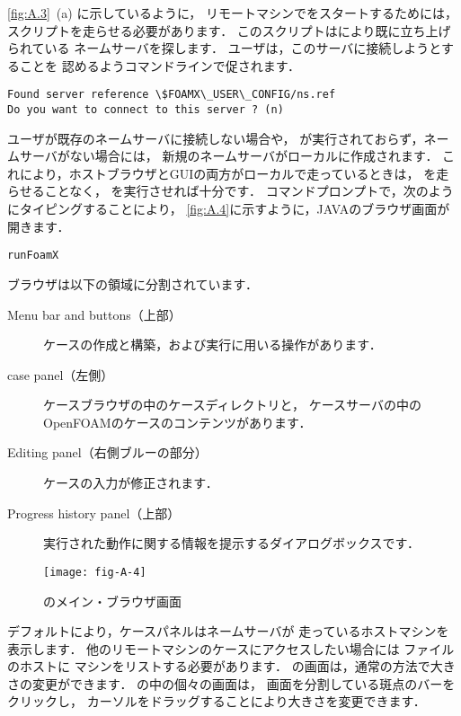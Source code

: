 \autoref{fig:A.3}~(a) に示しているように，
リモートマシンでをスタートするためには，
%
%
スクリプトを走らせる必要があります．
このスクリプトはにより既に立ち上げられている
ネームサーバを探します．
ユーザは，このサーバに接続しようとすることを
認めるようコマンドラインで促されます．
\begin{OFterminal}
\begin{verbatim}
Found server reference \$FOAMX\_USER\_CONFIG/ns.ref
Do you want to connect to this server ? (n)
\end{verbatim}
\end{OFterminal}
ユーザが既存のネームサーバに接続しない場合や，
が実行されておらず，ネームサーバがない場合には，
新規のネームサーバがローカルに作成されます．
これにより，ホストブラウザとGUIの両方がローカルで走っているときは，
を走らせることなく，
を実行させれば十分です．
コマンドプロンプトで，次のようにタイピングすることにより，
\autoref{fig:A.4}に示すように，JAVAのブラウザ画面が開きます．
\begin{OFterminal}
\begin{verbatim}
runFoamX
\end{verbatim}
\end{OFterminal}
ブラウザは以下の領域に分割されています．
\begin{description}
 \item[Menu bar and buttons（上部）]
            ケースの作成と構築，および実行に用いる操作があります．
 \item[case panel（左側）]
            ケースブラウザの中のケースディレクトリと，
            ケースサーバの中のOpenFOAMのケースのコンテンツがあります．
 \item[Editing panel（右側ブルーの部分）]
            ケースの入力が修正されます．
 \item[Progress history panel（上部）]
            実行された動作に関する情報を提示するダイアログボックスです．
\end{description}


\begin{figure}[ht]
 \texttt{[image: fig-A-4]}
 \caption{のメイン・ブラウザ画面}
 \label{fig:A.4}
\end{figure}


デフォルトにより，ケースパネルはネームサーバが
走っているホストマシンを表示します．
他のリモートマシンのケースにアクセスしたい場合には
ファイルのホストに
マシンをリストする必要があります．
の画面は，通常の方法で大きさの変更ができます．
の中の個々の画面は，
画面を分割している斑点のバーをクリックし，
カーソルをドラッグすることにより大きさを変更できます．

